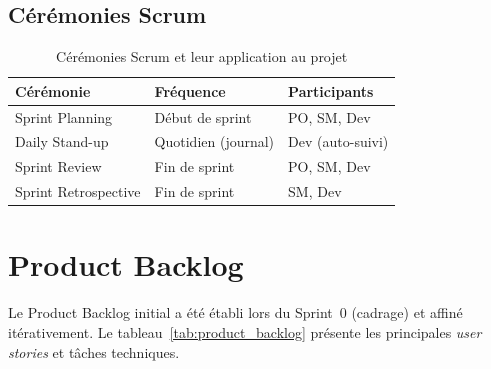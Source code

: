 \subsection{Cérémonies Scrum}

\begin{table}[H]
\centering
\caption{Cérémonies Scrum et leur application au projet}
\label{tab:ceremonies_scrum}
\begin{tabular}{lll}
\toprule
\textbf{Cérémonie} & \textbf{Fréquence} & \textbf{Participants} \\
\midrule
Sprint Planning & Début de sprint & PO, SM, Dev \\
Daily Stand-up & Quotidien (journal) & Dev (auto-suivi) \\
Sprint Review & Fin de sprint & PO, SM, Dev \\
Sprint Retrospective & Fin de sprint & SM, Dev \\
\bottomrule
\end{tabular}
\end{table}

\section{Product Backlog}

Le Product Backlog initial a été établi lors du Sprint~0 (cadrage) et affiné itérativement. Le tableau~\ref{tab:product_backlog} présente les principales \textit{user stories} et tâches techniques.

